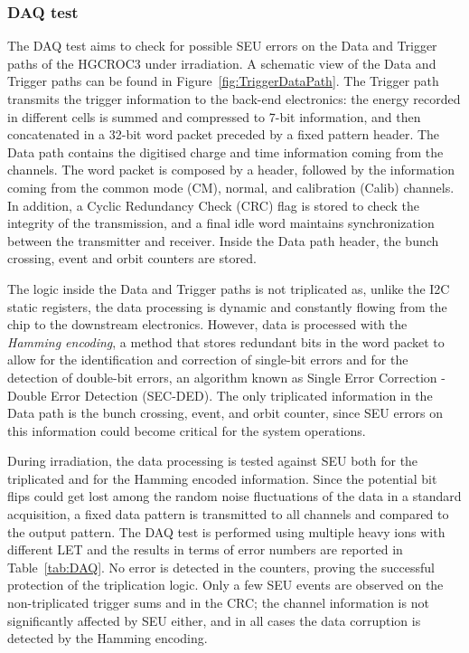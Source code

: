 \subsubsection{DAQ test}

The DAQ test aims to check for possible SEU errors on the Data and Trigger paths of the HGCROC3 under irradiation. 
A schematic view of the Data and Trigger paths can be found in Figure~\ref{fig:TriggerDataPath}.
The Trigger path transmits the trigger information to the back-end electronics: the energy recorded in different cells is summed and compressed to 7-bit information, and then concatenated in a 32-bit word packet preceded by a fixed pattern header.
The Data path contains the digitised charge and time information coming from the channels. The word packet is composed by a header, followed by the information coming from the common mode (CM), normal, and calibration (Calib) channels. In addition, a Cyclic Redundancy Check (CRC) flag is stored to check the integrity of the transmission, and a final idle word maintains synchronization between the transmitter and receiver.
Inside the Data path header, the bunch crossing, event and orbit counters are stored. 

The logic inside the Data and Trigger paths is not triplicated as, unlike the I2C static registers, the data processing is dynamic and constantly flowing from the chip to the downstream electronics. However, data is processed with the \textit{Hamming encoding}, a method that stores redundant bits in the word packet to allow for the identification and correction of single-bit errors and for the detection of double-bit errors, an algorithm known as Single Error Correction - Double Error Detection (SEC-DED). The only triplicated information in the Data path is the bunch crossing, event, and orbit counter, since SEU errors on this information could become critical for the system operations. 

\bigbreak

During irradiation, the data processing is tested against SEU both for the triplicated and for the Hamming encoded information.
Since the potential bit flips could get lost among the random noise fluctuations of the data in a standard acquisition, a fixed data pattern is transmitted to all channels and compared to the output pattern.
The DAQ test is performed using multiple heavy ions with different LET and the results in terms of error numbers are reported in Table~\ref{tab:DAQ}. No error is detected in the counters, proving the successful protection of the triplication logic.
Only a few SEU events are observed on the non-triplicated trigger sums and in the CRC; the channel information is not significantly affected by SEU either, and in all cases the data corruption is detected by the Hamming encoding. 

